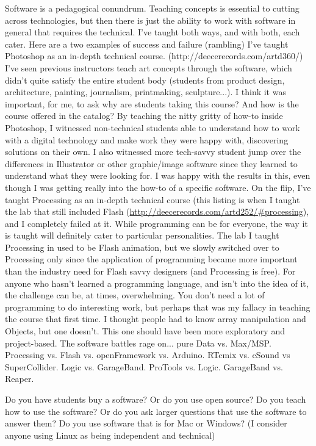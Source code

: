 Software is a pedagogical conundrum. Teaching concepts is essential to cutting across technologies, but then there is just the ability to work with software in general that requires the technical.  I've taught both ways, and with both, each cater.
Here are a two examples of success and failure (rambling)
 I've taught Photoshop as an in-depth technical course. (http://deecerecords.com/artd360/) I've seen previous instructors teach art concepts through the software, which didn't quite satisfy the entire student body (students from product design, architecture, painting, journalism, printmaking, sculpture...). I think it was important, for me, to ask why are students taking this course? And how is the course offered in the catalog?  By teaching the nitty gritty of how-to inside Photoshop, I witnessed non-technical students able to understand how to work with a digital technology and make work they were happy with, discovering solutions on their own. I also witnessed more tech-savvy student jump over the differences in Illustrator or other graphic/image software since they learned to understand what they were looking for. I was happy with the results in this, even though I was getting really into the how-to of a specific software.
	On the flip, I've taught Processing as an in-depth technical course (this listing is when I taught the lab that still included Flash (\url{http://deecerecords.com/artd252/#processing}), and I completely failed at it. While programming can be for everyone, the way it is taught will definitely cater to particular personalities. The lab I taught Processing in used to be Flash animation, but we slowly switched over to Processing only since the application of programming became more important than the industry need for Flash savvy designers (and Processing is free). For anyone who hasn't learned a programming language, and isn't into the idea of it, the challenge can be, at times, overwhelming. You don't need a lot of programming to do interesting work, but perhaps that was my fallacy in teaching the course that first time.  I thought people had to know array manipulation and Objects, but one doesn't.  This one should have been more exploratory and project-based.
	The software battles rage on...
	pure Data vs. Max/MSP.  
	Processing vs. Flash vs. openFramework vs. Arduino.  
	RTcmix vs. cSound vs SuperCollider.
	Logic vs. GarageBand.  ProTools vs. Logic.  GarageBand vs. Reaper.
	
	Do you have students buy a software? Or do you use open source?
	Do you teach how to use the software? Or do you ask larger questions that use the software to answer them?
	Do you use software that is for Mac or Windows? (I consider anyone using Linux as being independent and technical)

